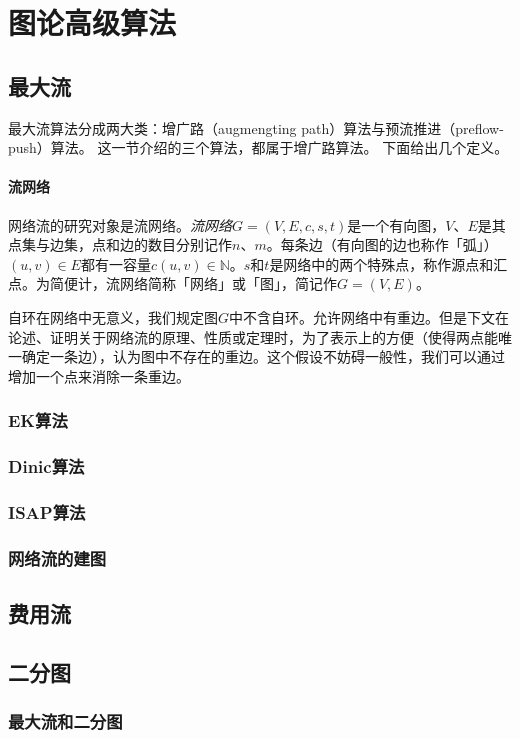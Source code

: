\documentclass[fontset=ubuntu]{ctexbook}
\begin{document}
    \chapter{图论高级算法}
    \section{最大流}
    最大流算法分成两大类：增广路（augmengting path）算法与预流推进（preflow-push）算法。
    这一节介绍的三个算法，都属于增广路算法。
    下面给出几个定义。
    \subsubsection*{流网络}
    网络流的研究对象是流网络。\emph{流网络}$G=(V,E,c,s,t)$是一个有向图，$V$、$E$是其点集与边集，点和边的数目分别记作$n$、$m$。每条边（有向图的边也称作「弧」）$(u,v)\in E$都有一容量$c(u,v)\in \mathbb{N}$。$s$和$t$是网络中的两个特殊点，称作源点和汇点。为简便计，流网络简称「网络」或「图」，简记作$G=(V,E)$。

    自环在网络中无意义，我们规定图$G$中不含自环。允许网络中有重边。但是下文在论述、证明关于网络流的原理、性质或定理时，为了表示上的方便（使得两点能唯一确定一条边），认为图中不存在的重边。这个假设不妨碍一般性，我们可以通过增加一个点来消除一条重边。





    \subsection{EK算法}
    \subsection{Dinic算法}
    \subsection{ISAP算法}
    \subsection{网络流的建图}
    \section{费用流}
    \section{二分图}
    \subsection{最大流和二分图}
\end{document}
